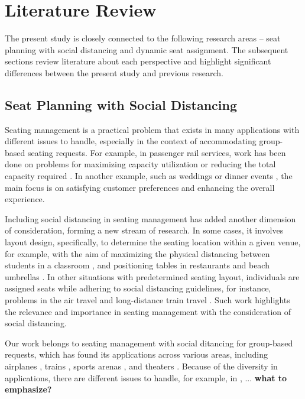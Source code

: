 \section{Literature Review}\label{literature}
The present study is closely connected to the following research areas -- seat planning with social distancing and dynamic seat assignment. The subsequent sections review literature about each perspective and highlight significant differences between the present study and previous research.


\subsection{Seat Planning with Social Distancing}
Seating management is a practical problem that exists in many applications with different issues to handle, especially in the context of accommodating group-based seating requests.  For example, in  passenger rail services, work has been done on problems for maximizing capacity utilization or reducing the total capacity required \cite{clausen2010off, deplano2019offline}. In another example, such as weddings or dinner events \cite{lewis2016creating}, the main focus is on satisfying customer preferences and enhancing the overall experience. 

Including social distancing in seating management has added another dimension of consideration, forming a new stream of research. In some cases, it involves layout design, specifically, to determine the seating location within a given venue, for example, with the aim of maximizing the physical distancing between students in a classroom \cite{bortolete2022support}, and positioning tables in restaurants and beach umbrellas \cite{fischetti2023safe}. In other situations with predetermined seating layout, individuals are assigned seats while adhering to social distancing guidelines, for instance, problems in the air travel \cite{ghorbani2020model} and long-distance train travel \cite{haque2022optimization}. Such work highlights the relevance and importance in seating management with the consideration of social distancing.


Our work belongs to seating management with social ditancing for group-based requests, which has found its applications across various areas, including airplanes \cite{salari2022social}, trains \cite{haque2023social}, sports arenas \cite{kwag2022optimal}, and theaters \cite{blom2022filling}. Because of the diversity in applications, there are different issues to handle, for example, in \cite{salari2022social}, ... {\bf{what to emphasize?}}

